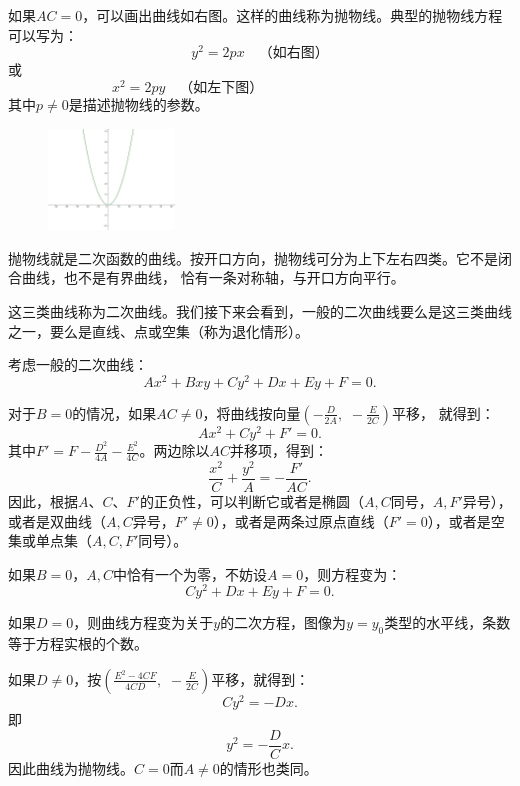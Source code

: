 \documentclass[12pt,UTF8]{ctexbook}
\begin{document}
如果$AC = 0$，可以画出曲线如右图。这样的曲线称为抛物线。典型的抛物线方程可以写为：
$$ y^2 = 2px  \quad \mbox{（如右图）} $$
或
$$ x^2 = 2py  \quad \mbox{（如左下图）} \qquad  \qquad  \qquad  \qquad\;\;\; \phantom{123}$$
其中$p \neq 0$是描述抛物线的参数。

\begin{figure} %
    \vspace{-30pt}
    \flushright
    \includegraphics[width=0.3\textwidth]{tu/抛物线2.png}
\end{figure}

抛物线就是二次函数的曲线。按开口方向，抛物线可分为上下左右四类。它不是闭合曲线，也不是有界曲线，
恰有一条对称轴，与开口方向平行。

这三类曲线称为二次曲线。我们接下来会看到，一般的二次曲线要么是这三类曲线之一，要么是直线、点或空集（称为退化情形）。

考虑一般的二次曲线：
$$ Ax^2 + Bxy + Cy^2 + Dx + Ey + F = 0.$$

对于$B = 0$的情况，如果$AC\neq 0$，将曲线按向量$\displaystyle\left(-\frac{D}{2A},\,\,-\frac{E}{2C}\right)$平移，
就得到：
$$ Ax^2 + Cy^2 + F' = 0.$$
其中$F' = F - \frac{D^2}{4A} - \frac{E^2}{4C}$。两边除以$AC$并移项，得到：
$$ \frac{x^2}{C} + \frac{y^2}{A} = -\frac{F'}{AC}.$$
因此，根据$A$、$C$、$F'$的正负性，可以判断它或者是椭圆（$A,C$同号，$A,F'$异号），
或者是双曲线（$A,C$异号，$F' \neq 0$），或者是两条过原点直线（$F' = 0$），或者是空集或单点集（$A,C,F'$同号）。

如果$B = 0$，$A,C$中恰有一个为零，不妨设$A = 0$，则方程变为：
$$ Cy^2 + Dx + Ey + F = 0.$$

如果$D = 0$，则曲线方程变为关于$y$的二次方程，图像为$y = y_0$类型的水平线，条数等于方程实根的个数。

如果$D\neq 0$，按$\displaystyle\left(\frac{E^2 - 4CF}{4CD},\,\,-\frac{E}{2C}\right)$平移，就得到：
$$ Cy^2 = -Dx. $$
即
$$ y^2 = -\frac{D}{C}x. $$
因此曲线为抛物线。$C=0$而$A\neq 0$的情形也类同。
\end{document}

